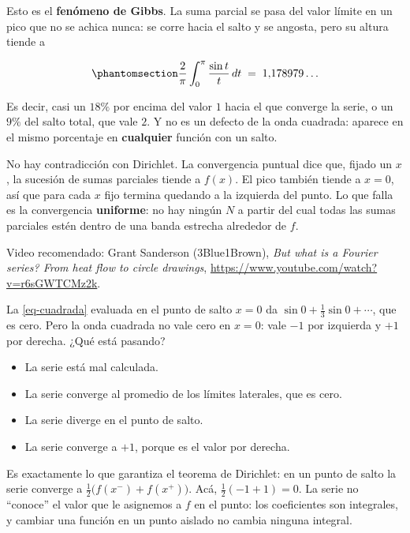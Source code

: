 \documentclass[
  spanish,
  a4paper,
]{scrbook}
\providecommand{\tightlist}{%
  \setlength{\itemsep}{0pt}\setlength{\parskip}{0pt}}
\theoremstyle{definition}
\theoremstyle{plain}
\theoremstyle{definition}
\theoremstyle{plain}
\theoremstyle{definition}
\theoremstyle{remark}
\begin{document}
Esto es el \textbf{fenómeno de Gibbs}. La suma parcial se pasa del valor
límite en un pico que no se achica nunca: se corre hacia el salto y se
angosta, pero su altura tiende a

\begin{equation}\protect\phantomsection\label{eq-gibbs}{
\frac{2}{\pi}\int_0^{\pi} \frac{\sin t}{t}\,dt \;=\; 1{,}178979\ldots
}\end{equation}

Es decir, casi un \(18\%\) por encima del valor \(1\) hacia el que
converge la serie, o un \(9\%\) del salto total, que vale \(2\). Y no es
un defecto de la onda cuadrada: aparece en el mismo porcentaje en
\textbf{cualquier} función con un salto.

No hay contradicción con Dirichlet. La convergencia puntual dice que,
fijado un \(x\), la sucesión de sumas parciales tiende a \(f(x)\). El
pico también tiende a \(x=0\), así que para cada \(x\) fijo termina
quedando a la izquierda del punto. Lo que falla es la convergencia
\textbf{uniforme}: no hay ningún \(N\) a partir del cual todas las sumas
parciales estén dentro de una banda estrecha alrededor de \(f\).

Video recomendado: Grant Sanderson (3Blue1Brown), \emph{But what is a
Fourier series? From heat flow to circle drawings},
\url{https://www.youtube.com/watch?v=r6sGWTCMz2k}.

La \ref{eq-cuadrada} evaluada en el punto de salto \(x = 0\) da
\(\sin 0 + \tfrac{1}{3}\sin 0 + \cdots\), que es cero. Pero la onda
cuadrada no vale cero en \(x=0\): vale \(-1\) por izquierda y \(+1\) por
derecha. ¿Qué está pasando?

\begin{itemize}
\tightlist
\item
  {La serie está mal calculada.}
\item
  {La serie converge al promedio de los límites laterales, que es cero.}
\item
  {La serie diverge en el punto de salto.}
\item
  {La serie converge a \(+1\), porque es el valor por derecha.}
\end{itemize}

Es exactamente lo que garantiza el teorema de Dirichlet: en un punto de
salto la serie converge a \(\tfrac{1}{2}\big(f(x^-) + f(x^+)\big)\).
Acá, \(\tfrac{1}{2}(-1 + 1) = 0\). La serie no ``conoce'' el valor que
le asignemos a \(f\) en el punto: los coeficientes son integrales, y
cambiar una función en un punto aislado no cambia ninguna integral.
\end{document}
